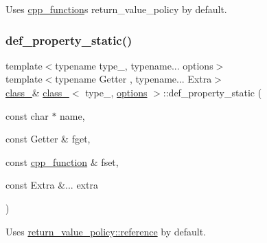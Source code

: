 Uses \mbox{\hyperlink{classcpp__function}{cpp\+\_\+function}}\textquotesingle{}s return\+\_\+value\+\_\+policy by default. 

\mbox{\label{classclass___ab78c60e008d354283f76eef3b7c6e221}} 
\subsubsection{\texorpdfstring{def\_property\_static()}{def\_property\_static()}\hspace{0.1cm}{\footnotesize\ttfamily [1/2]}}
{\footnotesize\ttfamily template$<$typename type\+\_\+, typename... options$>$ \\
template$<$typename Getter , typename... Extra$>$ \\
\mbox{\hyperlink{classclass__}{class\+\_\+}}\& \mbox{\hyperlink{classclass__}{class\+\_\+}}$<$ type\+\_\+, \mbox{\hyperlink{classoptions}{options}} $>$\+::def\+\_\+property\+\_\+static (\begin{DoxyParamCaption}\item[{const char $\ast$}]{name,  }\item[{const Getter \&}]{fget,  }\item[{const \mbox{\hyperlink{classcpp__function}{cpp\+\_\+function}} \&}]{fset,  }\item[{const Extra \&...}]{extra }\end{DoxyParamCaption})\hspace{0.3cm}{\ttfamily [inline]}}



Uses \mbox{\hyperlink{detail_2common_8h_adde72ab1fb0dd4b48a5232c349a53841ab8af13ea9c8fe890c9979a1fa8dbde22}{return\+\_\+value\+\_\+policy\+::reference}} by default. 

\mbox{\label{classclass___a1c2c3cfa3f7ba78fcb344a716dcc59a3}} 
